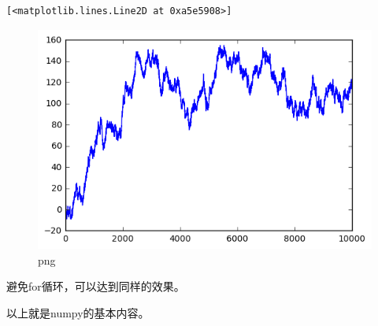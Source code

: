 \documentclass[]{article}
\begin{document}
\begin{verbatim}
[<matplotlib.lines.Line2D at 0xa5e5908>]
\end{verbatim}

\begin{figure}
\centering
\includegraphics{output_220_1.png}
\caption{png}
\end{figure}

避免for循环，可以达到同样的效果。

以上就是numpy的基本内容。
\end{document}
